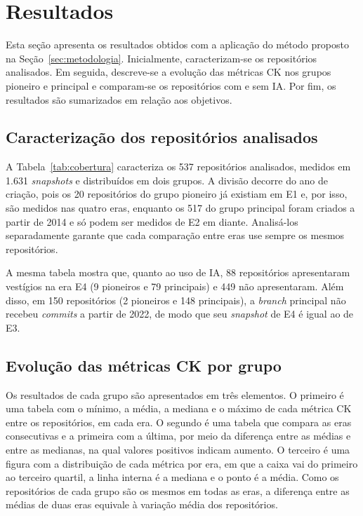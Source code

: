 \section{Resultados}
\label{sec:resultados}

Esta seção apresenta os resultados obtidos com a aplicação do método proposto na Seção~\ref{sec:metodologia}. Inicialmente, caracterizam-se os repositórios analisados. Em seguida, descreve-se a evolução das métricas CK nos grupos pioneiro e principal e comparam-se os repositórios com e sem IA. Por fim, os resultados são sumarizados em relação aos objetivos.

\subsection{Caracterização dos repositórios analisados}

A Tabela~\ref{tab:cobertura} caracteriza os 537 repositórios analisados, medidos em 1.631 \emph{snapshots} e distribuídos em dois grupos. A divisão decorre do ano de criação, pois os 20 repositórios do grupo pioneiro já existiam em E1 e, por isso, são medidos nas quatro eras, enquanto os 517 do grupo principal foram criados a partir de 2014 e só podem ser medidos de E2 em diante. Analisá-los separadamente garante que cada comparação entre eras use sempre os mesmos repositórios.



A mesma tabela mostra que, quanto ao uso de IA, 88 repositórios apresentaram vestígios na era E4 (9 pioneiros e 79 principais) e 449 não apresentaram. Além disso, em 150 repositórios (2 pioneiros e 148 principais), a \emph{branch} principal não recebeu \emph{commits} a partir de 2022, de modo que seu \emph{snapshot} de E4 é igual ao de E3.

\subsection{Evolução das métricas CK por grupo}

Os resultados de cada grupo são apresentados em três elementos. O primeiro é uma tabela com o mínimo, a média, a mediana e o máximo de cada métrica CK entre os repositórios, em cada era. O segundo é uma tabela que compara as eras consecutivas e a primeira com a última, por meio da diferença entre as médias e entre as medianas, na qual valores positivos indicam aumento. O terceiro é uma figura com a distribuição de cada métrica por era, em que a caixa vai do primeiro ao terceiro quartil, a linha interna é a mediana e o ponto é a média. Como os repositórios de cada grupo são os mesmos em todas as eras, a diferença entre as médias de duas eras equivale à variação média dos repositórios.

